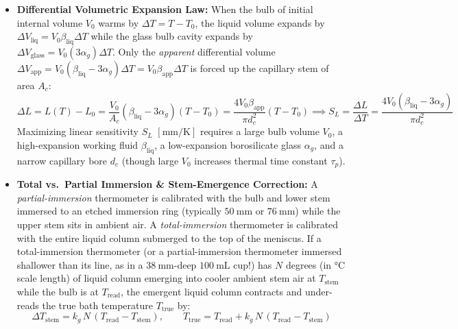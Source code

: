 \begin{itemize}
  \item \textbf{Differential Volumetric Expansion Law:} When the bulb of initial internal volume $V_0$ warms by $\Delta T = T - T_0$, the liquid volume expands by $\Delta V_{\mathrm{liq}} = V_0 \beta_{\mathrm{liq}}\Delta T$ while the glass bulb cavity expands by $\Delta V_{\mathrm{glass}} = V_0 (3\alpha_g)\Delta T$. Only the \emph{apparent} differential volume $\Delta V_{\mathrm{app}} = V_0(\beta_{\mathrm{liq}} - 3\alpha_g)\Delta T = V_0\beta_{\mathrm{app}}\Delta T$ is forced up the capillary stem of area $A_c$:
  \begin{equation}\label{eq:17:lig}
    \Delta L = L(T) - L_0 = \frac{V_0}{A_c}(\beta_{\mathrm{liq}} - 3\alpha_g)(T - T_0) = \frac{4 V_0 \beta_{\mathrm{app}}}{\pi d_c^2}(T - T_0) \implies S_L = \frac{\Delta L}{\Delta T} = \frac{4 V_0(\beta_{\mathrm{liq}} - 3\alpha_g)}{\pi d_c^2}
  \end{equation}
  Maximizing linear sensitivity $S_L$ $[\si{\milli\meter\per\kelvin}]$ requires a large bulb volume $V_0$, a high-expansion working fluid $\beta_{\mathrm{liq}}$, a low-expansion borosilicate glass $\alpha_g$, and a narrow capillary bore $d_c$ (though large $V_0$ increases thermal time constant $\tau_p$).
  \item \textbf{Total vs.\ Partial Immersion \& Stem-Emergence Correction:}  A \emph{partial-immersion} thermometer is calibrated with the bulb and lower stem immersed to an etched immersion ring (typically $\SI{50}{\milli\meter}$ or $\SI{76}{\milli\meter}$) while the upper stem sits in ambient air. A \emph{total-immersion} thermometer is calibrated with the entire liquid column submerged to the top of the meniscus. If a total-immersion thermometer (or a partial-immersion thermometer immersed shallower than its line, as in a $\SI{38}{\milli\meter}$-deep $\SI{100}{\milli\liter}$ cup!) has $N$ degrees (in $\si{\celsius}$ scale length) of liquid column emerging into cooler ambient stem air at $T_{\mathrm{stem}}$ while the bulb is at $T_{\mathrm{read}}$, the emergent liquid column contracts and under-reads the true bath temperature $T_{\mathrm{true}}$ by:
  \begin{equation}\label{eq:17:stem}
    \Delta T_{\mathrm{stem}} = k_g\,N\,(T_{\mathrm{read}} - T_{\mathrm{stem}}), \qquad T_{\mathrm{true}} = T_{\mathrm{read}} + k_g\,N\,(T_{\mathrm{read}} - T_{\mathrm{stem}})
  \end{equation}

\end{itemize}
